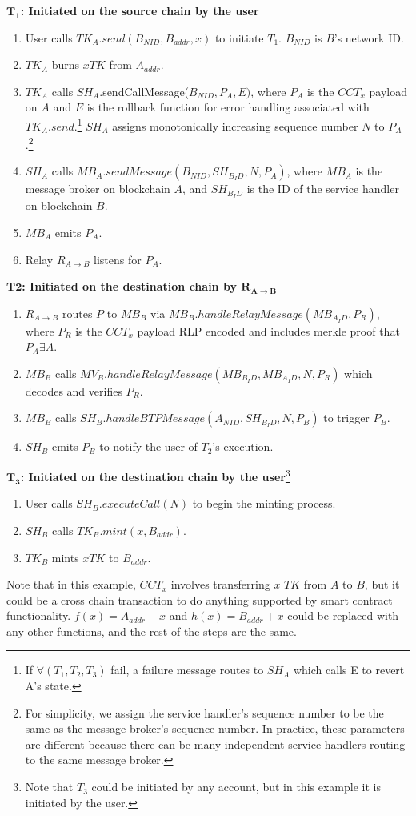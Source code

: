 \documentclass{article}
\newcounter{algo_steps}
\begin{document}
{{\textbf{{$\bm{T_1}$: Initiated on the source chain by the user}}
\begin{enumerate}
\item User calls $TK_A.send(B_{NID}, B_{addr}, x)$ to initiate $T_1$. $B_{NID}$ is $B$’s network ID.
\item $TK_A$ burns $x TK$ from $A_{addr}$.
\item $TK_A$ calls $SH_A$.sendCallMessage($B_{NID}, P_A, E)$, where $P_A$ is the $CCT_x$ payload on $A$ and $E$ is the rollback function for error handling associated with $TK_A.send$.\footnote{If $\forall(T_1, T_2, T_3)$ fail, a failure message routes to $SH_A$ which calls E to revert A’s state.} $SH_A$ assigns monotonically increasing sequence number $N$ to $P_A$.\footnote{ For simplicity, we assign the service handler’s sequence number to be the same as the message broker’s sequence number. In practice, these parameters are different because there can be many independent service handlers routing to the same message broker.}
\item $SH_A$ calls $MB_A.sendMessage(B_{NID}, SH_{B_ID}, N, P_A)$, where $MB_A$ is the message broker on blockchain $A$, and $SH_{B_ID}$ is the ID of the service handler on blockchain $B$.
\item $MB_A$ emits $P_A$.
\item Relay $R_{A \rightarrow B}$ listens for $P_A$.
\setcounter{algo_steps}{\value{enumi}}
\end{enumerate}
\textbf{$\bm{T2}$: Initiated on the destination chain by $\bm{R_{A \rightarrow B}}$}
\begin{enumerate}
\setcounter{enumi}{\value{algo_steps}}
\item $R_{A \rightarrow B}$ routes $P$ to $MB_B$ via $MB_B.handleRelayMessage(MB_{A_ID}, P_R)$, where $P_R$ is the $CCT_x$ payload RLP encoded and includes merkle proof that $P_A \exists A$.
\item $MB_B$ calls $MV_B.handleRelayMessage(MB_{B_ID}, MB_{A_ID}, N, P_R)$ which decodes and verifies $P_R$.
\item $MB_B$ calls $SH_B.handleBTPMessage(A_{NID}, SH_{B_ID}, N, P_B)$ to trigger $P_B$.
\item$SH_B$ emits $P_B$ to notify the user of $T_2$’s execution.
\setcounter{algo_steps}{\value{enumi}}
\end{enumerate}
\textbf{$\bm{T_3}$: Initiated on the destination chain by the user}\footnote{Note that $T_3$ could be initiated by any account, but in this example it is initiated by the user.}
\begin{enumerate}
\setcounter{enumi}{\value{algo_steps}}
\item User calls $SH_B.executeCall(N)$ to begin the minting process.
\item $SH_B$ calls $TK_B.mint(x, B_{addr})$.
\item $TK_B$ mints $x TK$ to $B_{addr}$.
\end{enumerate}
Note that in this example, $CCT_x$ involves transferring $x$ $TK$ from $A$ to $B$, but it could be a cross chain transaction to do anything supported by smart contract functionality. $f(x) = A_{addr} - x$ and $h(x) = B_{addr} + x$ could be replaced with any other functions, and the rest of the steps are the same.
}
}
\end{document}
